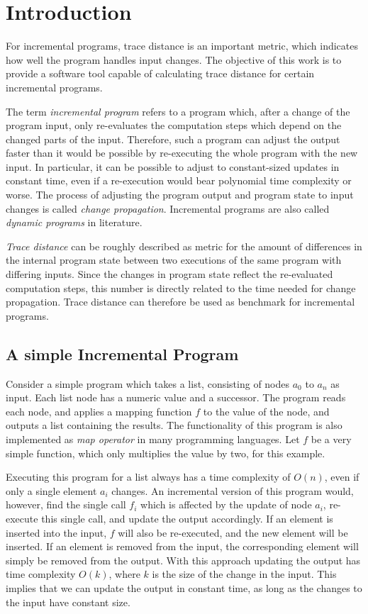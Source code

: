 
\chapter{Introduction}
\label{ch:Introduction}

For incremental programs, trace distance is an important metric, which indicates how well the program handles input changes. The objective of this work is to provide a software tool capable of calculating trace distance for certain incremental programs.  

The term \textit{incremental program} refers to a program which, after a change of the program input, only re-evaluates the computation steps which depend on the changed parts of the input. Therefore, such a program can adjust the output faster than it would be possible by re-executing the whole program with the new input. In particular, it can be possible to adjust to constant-sized updates in constant time, even if a re-execution would bear polynomial time complexity or worse. The process of adjusting the program output and program state to input changes is called \textit{change propagation}. Incremental programs are also called \textit{dynamic programs} in literature. 

\textit{Trace distance} can be roughly described as metric for the amount of differences in the internal program state between two executions of the same program with differing inputs. Since the changes in program state reflect the re-evaluated computation steps, this number is directly related to the time needed for change propagation. Trace distance can therefore be used as benchmark for incremental programs. 

\section{A simple Incremental Program}
\label{sec:simple_example}
Consider a simple program which takes a list, consisting of nodes $a_0$ to $a_n$ as input. Each list node has a numeric value and a successor. The program reads each node, and applies a mapping function $f$ to the value of the node, and outputs a list containing the results. The functionality of this program is also implemented as \textit{map operator} in many programming languages. Let $f$ be a very simple function, which only multiplies the value by two, for this example. 

Executing this program for a list always has a time complexity of $O(n)$, even if only a single element $a_i$ changes. An incremental version of this program would, however, find the single call $f_i$ which is affected by the update of node $a_i$, re-execute this single call, and update the output accordingly. If an element is inserted into the input, $f$ will also be re-executed, and the new element will be inserted. If an element is removed from the input, the corresponding element will simply be removed from the output. With this approach updating the output has time complexity $O(k)$, where $k$ is the size of the change in the input. This implies that we can update the output in constant time, as long as the changes to the input have constant size. 

